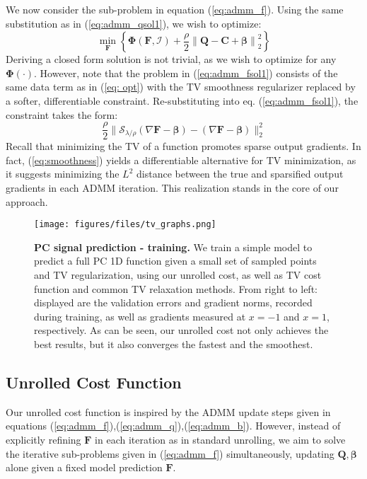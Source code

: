 \documentclass[10pt,twocolumn,letterpaper]{article}
\begin{document}
We now consider the sub-problem in equation (\ref{eq:admm_f}). Using the same substitution as in (\ref{eq:admm_qsol1}), we wish to optimize:
\begin{equation}
    \min_{\mathbf{F}} \left\{\mathbf{\Phi}\left( \mathbf{F},\mathcal{I} \right) + \frac{\rho}{2} \mathbf{\|Q - C + \boldsymbol{\beta}\|}_2^2 \right\} \label{eq:admm_fsol1}
\end{equation}
Deriving a closed form solution is not trivial, as we wish to optimize for any $\mathbf{\Phi(\cdot)}$. However, note that the problem in (\ref{eq:admm_fsol1}) consists of the same data term as in (\ref{eq: opt}) with the TV smoothness regularizer replaced by a softer, differentiable constraint. Re-substituting into eq. (\ref{eq:admm_fsol1}), the constraint takes the form:
\begin{equation}
    \frac{\rho}{2} \|\mathcal{S}_{\lambda/\rho} \left(\nabla \mathbf{F}-\boldsymbol{\beta} \right) - \left(\nabla \mathbf{F} - \boldsymbol{\beta}\right)\|_2^2 \label{eq:smoothness}
\end{equation}
Recall that minimizing the TV of a function promotes sparse output gradients. In fact, (\ref{eq:smoothness}) yields a differentiable alternative for TV minimization, as it suggests minimizing the $L^2$ distance between the true and sparsified output gradients in each ADMM iteration. This realization stands in the core of our approach.



\begin{figure*}
\begin{center}
\texttt{[image: figures/files/tv\_graphs.png]}
   \caption{\textbf{PC signal prediction - training.} We train a simple model to predict a full PC 1D function given a small set of sampled points and TV regularization, using our unrolled cost, as well as TV cost function and common TV relaxation methods. From right to left: displayed are the validation errors and gradient norms, recorded during training, as well as gradients measured at $x=-1$ and $x=1$, respectively. As can be seen, our unrolled cost not only achieves the best results, but it also converges the fastest and the smoothest.}
\label{fig:toy_graphs}
\end{center}
\end{figure*} 
\subsection{Unrolled Cost Function}
Our unrolled cost function is inspired by the ADMM update steps given in equations (\ref{eq:admm_f}),(\ref{eq:admm_q}),(\ref{eq:admm_b}). However, instead of explicitly refining $\mathbf{F}$ in each iteration as in standard unrolling, we aim to solve the iterative sub-problems given in (\ref{eq:admm_f}) simultaneously, updating $\mathbf{Q},\boldsymbol{\beta}$ alone given a fixed model prediction $\mathbf{F}$.
\end{document}
